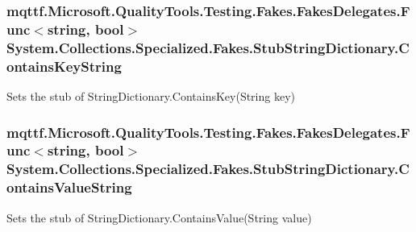 \hypertarget{class_system_1_1_collections_1_1_specialized_1_1_fakes_1_1_stub_string_dictionary_aaed3c24359e355e610e14cb9f2b5f1dd}{
\subsubsection[{Contains\-Key\-String}]{\setlength{\rightskip}{0pt plus 5cm}mqttf.\-Microsoft.\-Quality\-Tools.\-Testing.\-Fakes.\-Fakes\-Delegates.\-Func$<$string, bool$>$ System.\-Collections.\-Specialized.\-Fakes.\-Stub\-String\-Dictionary.\-Contains\-Key\-String}}\label{class_system_1_1_collections_1_1_specialized_1_1_fakes_1_1_stub_string_dictionary_aaed3c24359e355e610e14cb9f2b5f1dd}


Sets the stub of String\-Dictionary.\-Contains\-Key(\-String key)

\hypertarget{class_system_1_1_collections_1_1_specialized_1_1_fakes_1_1_stub_string_dictionary_a12b989ba7d1483496005597ad7b3f91a}{
\subsubsection[{Contains\-Value\-String}]{\setlength{\rightskip}{0pt plus 5cm}mqttf.\-Microsoft.\-Quality\-Tools.\-Testing.\-Fakes.\-Fakes\-Delegates.\-Func$<$string, bool$>$ System.\-Collections.\-Specialized.\-Fakes.\-Stub\-String\-Dictionary.\-Contains\-Value\-String}}\label{class_system_1_1_collections_1_1_specialized_1_1_fakes_1_1_stub_string_dictionary_a12b989ba7d1483496005597ad7b3f91a}


Sets the stub of String\-Dictionary.\-Contains\-Value(\-String value)

